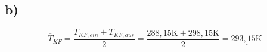 

\subsection*{b)}

\begin{equation*}
\overline{T}_{KF} = \frac{T_{KF,ein} + T_{KF,aus}}{2} = \frac{288,15 \text{K} + 298,15 \text{K}}{2} = \underline{293,15 \text{K}}
\end{equation*}